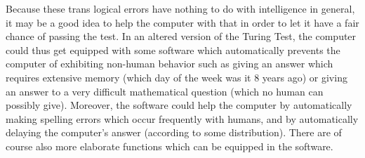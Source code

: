 Because these trans logical errors have nothing to do with intelligence in general, it may be a good idea to help the computer with that in order to let it have a fair chance of passing the test. In an altered version of the Turing Test, the computer could thus get equipped with some software which automatically prevents the computer of exhibiting non-human behavior such as giving an answer which requires extensive memory (which day of the week was it 8 years ago) or giving an answer to a very difficult mathematical question (which no human can possibly give). Moreover, the software could help the computer by automatically making spelling errors which occur frequently with humans, and by automatically delaying the computer’s answer (according to some distribution). There are of course also more elaborate functions which can be equipped in the software.
